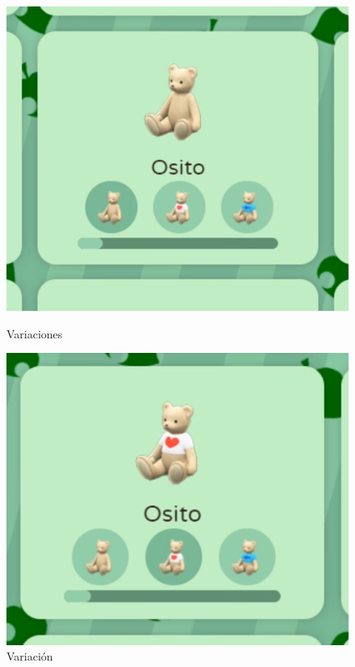 \begin{figure}[!htb]
	\begin{minipage}{0.48\textwidth}
		\centering
		\includegraphics[width=.9\linewidth]{img/cap9/11-catalogo-muebles-variaciones.png}
		\caption{Variaciones}
		\label{fig:variaciones}
	\end{minipage}\hfill
	\begin{minipage}{0.48\textwidth}
		\centering
		\includegraphics[width=.9\linewidth]{img/cap9/12-cat-muebles-variante.png}
		\caption{Variación}
		\label{fig:variacion}
	\end{minipage}
\end{figure}

